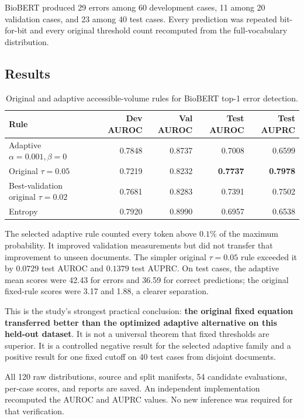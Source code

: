 BioBERT produced 29 errors among 60 development cases, 11 among 20 validation cases, and 23 among 40 test cases. Every prediction was repeated bit-for-bit and every original threshold count recomputed from the full-vocabulary distribution.

\subsection{Results}
\begin{table}[htbp]
\centering
\caption{Original and adaptive accessible-volume rules for BioBERT top-1 error detection.}
\label{tab:biobert}
{\small
\begin{tabular}{p{5.4cm}rrrr}
\toprule
Rule&Dev AUROC&Val AUROC&Test AUROC&Test AUPRC\\
\midrule
Adaptive $\alpha=0.001,\beta=0$&0.7848&0.8737&0.7008&0.6599\\
Original $\tau=0.05$&0.7219&0.8232&\textbf{0.7737}&\textbf{0.7978}\\
Best-validation original $\tau=0.02$&0.7681&0.8283&0.7391&0.7502\\
Entropy&0.7920&0.8990&0.6957&0.6538\\
\bottomrule
\end{tabular}}
\end{table}
The selected adaptive rule counted every token above $0.1\%$ of the maximum probability. It improved validation measurements but did not transfer that improvement to unseen documents. The simpler original $\tau=0.05$ rule exceeded it by $0.0729$ test AUROC and $0.1379$ test AUPRC. On test cases, the adaptive mean scores were 42.43 for errors and 36.59 for correct predictions; the original fixed-rule scores were 3.17 and 1.88, a clearer separation.

This is the study's strongest practical conclusion: \textbf{the original fixed equation transferred better than the optimized adaptive alternative on this held-out dataset}. It is not a universal theorem that fixed thresholds are superior. It is a controlled negative result for the selected adaptive family and a positive result for one fixed cutoff on 40 test cases from disjoint documents.

All 120 raw distributions, source and split manifests, 54 candidate evaluations, per-case scores, and reports are saved. An independent implementation recomputed the AUROC and AUPRC values. No new inference was required for that verification.

